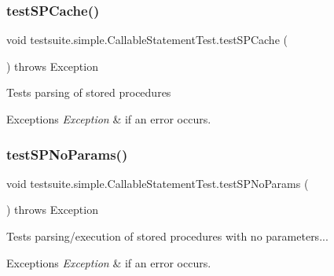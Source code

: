 \subsubsection{\texorpdfstring{test\+S\+P\+Cache()}{testSPCache()}}
{\footnotesize\ttfamily void testsuite.\+simple.\+Callable\+Statement\+Test.\+test\+S\+P\+Cache (\begin{DoxyParamCaption}{ }\end{DoxyParamCaption}) throws Exception}

Tests parsing of stored procedures


\begin{DoxyExceptions}{Exceptions}
{\em Exception} & if an error occurs. \\
\hline
\end{DoxyExceptions}
\mbox{\label{classtestsuite_1_1simple_1_1_callable_statement_test_a5382df497dce2b6ecd935d4550a5b505}} 
\subsubsection{\texorpdfstring{test\+S\+P\+No\+Params()}{testSPNoParams()}}
{\footnotesize\ttfamily void testsuite.\+simple.\+Callable\+Statement\+Test.\+test\+S\+P\+No\+Params (\begin{DoxyParamCaption}{ }\end{DoxyParamCaption}) throws Exception}

Tests parsing/execution of stored procedures with no parameters...


\begin{DoxyExceptions}{Exceptions}
{\em Exception} & if an error occurs. \\
\hline
\end{DoxyExceptions}
\mbox{\label{classtestsuite_1_1simple_1_1_callable_statement_test_ad2d1ffaddb39bf287b37661e592ef2f6}} 
